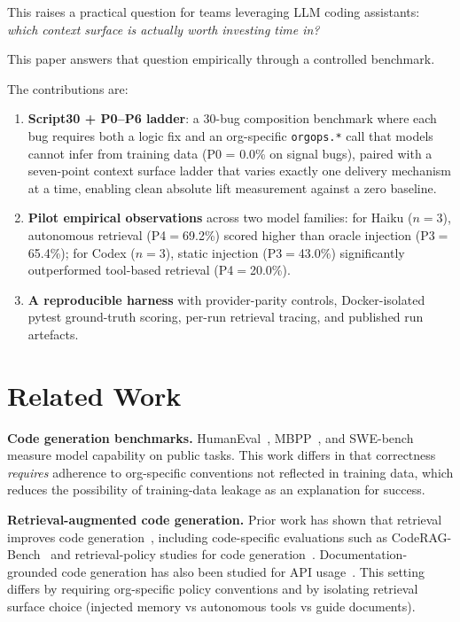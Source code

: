 \documentclass[10pt,a4paper,twocolumn]{article}
\begin{document}
This raises a practical question for teams leveraging LLM coding assistants:
\emph{which context surface is actually worth investing time in?}

This paper answers that question empirically through a controlled benchmark.

The contributions are:

\begin{enumerate}
    \item \textbf{Script30 + P0--P6 ladder}: a 30-bug composition benchmark where each bug requires both a logic fix and an org-specific \texttt{orgops.*} call that models cannot infer from training data (P0 = 0.0\% on signal bugs), paired with a seven-point context surface ladder that varies exactly one delivery mechanism at a time, enabling clean absolute lift measurement against a zero baseline.
    \item \textbf{Pilot empirical observations} across two model families:
    for Haiku ($n{=}3$), autonomous retrieval (P4$=$69.2\%) scored higher than oracle injection (P3$=$65.4\%); for Codex ($n{=}3$), static injection (P3$=$43.0\%) significantly outperformed tool-based retrieval
    (P4$=$20.0\%).
    \item \textbf{A reproducible harness} with provider-parity controls,
    Docker-isolated pytest ground-truth scoring, per-run retrieval tracing,
    and published run artefacts.
\end{enumerate}
\section{Related Work}
\label{sec:related-work}

\textbf{Code generation benchmarks.}
HumanEval~\citep{chen2021evaluating}, MBPP~\citep{austin2021program}, and SWE-bench~\citep{jimenez2024swebench} measure model capability on public tasks.
This work differs in that correctness \emph{requires} adherence to org-specific conventions not reflected in training data, which reduces the possibility of training-data leakage as an explanation for success.

\textbf{Retrieval-augmented code generation.}
Prior work has shown that retrieval improves code generation~\citep{lewis2020retrieval}, including code-specific evaluations such as CodeRAG-Bench~\citep{wang2024coderagbench} and retrieval-policy studies for code generation~\citep{gu2025whattoretrieve}.
Documentation-grounded code generation has also been studied for API usage~\citep{chen2025apidocrag}.
This setting differs by requiring org-specific policy conventions and by isolating retrieval surface choice (injected memory vs autonomous tools vs guide documents).
\end{document}

